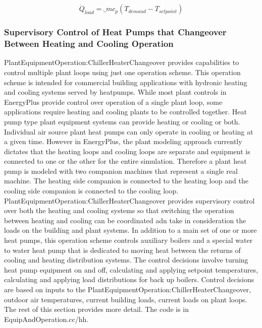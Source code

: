 \begin{equation}
\dot Q_{load} = {\dot_m}{c_p}( {T_{demand} - T_{setpoint}} )
\end{equation}

\subsubsection{Supervisory Control of Heat Pumps that Changeover Between Heating and Cooling Operation}\label{supervisory-changeover-heating-cooling-operation}

PlantEquipmentOperation:ChillerHeaterChangeover provides capabilities to control multiple plant loops using just one operation scheme. This operation scheme is intended for commercial building applications with hydronic heating and cooling systems served by heatpumps. While most plant controls in EnergyPlus provide control over operation of a single plant loop, some applications require heating and cooling plants to be controlled together.  Heat pump type plant equipment systems can provide heating or cooling or both. Individual air source plant heat pumps can only operate in cooling or heating at a given time.  However in EnergyPlus, the plant modeling approach currently dictates that the heating loops and cooling loops are separate and equipment is connected to one or the other for the entire simulation. Therefore a plant heat pump is modeled with two companion machines that represent a single real machine.  The heating side companion is connected to the heating loop and the cooling side companion is connected to the cooling loop.  PlantEquipmentOperation:ChillerHeaterChangeover provides supervisory control over both the heating and cooling systems so that switching the operation between heating and cooling can be coordinated adn take in consideration the loads on the building and plant systems. In addition to a main set of one or more heat pumps, this operation scheme controls auxiliary boilers and a special water to water heat pump that is dedicated to moving heat between the returns of cooling and heating distribution systems.  The control decisions involve turning heat pump equipment on and off, calculating and applying setpoint temperatures, calculating and applying load distributions for back up boilers. Control decisions are based on inputs to the PlantEquipmentOperation:ChillerHeaterChangeover, outdoor air temperatures, current building loads, current loads on plant loops.  The rest of this section provides more detail. The code is in EquipAndOperation.cc/hh.

